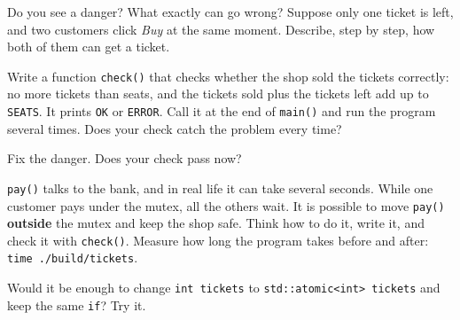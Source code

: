 \begin{questions}
  \item Do you see a danger? What exactly can go wrong? Suppose only one ticket is left, and two customers
        click \emph{Buy} at the same moment. Describe, step by step, how both of them can get a ticket.
  \item Write a function \texttt{check()} that checks whether the shop sold the tickets correctly: no more tickets
        than seats, and the tickets sold plus the tickets left add up to \texttt{SEATS}. It prints \texttt{OK} or
        \texttt{ERROR}. Call it at the end of \texttt{main()} and run the program several times.
        Does your check catch the problem every time?
  \item Fix the danger. Does your check pass now?
  \item \texttt{pay()} talks to the bank, and in real life it can take several seconds. While one customer pays
        under the mutex, all the others wait. It is possible to move \texttt{pay()} \textbf{outside} the mutex and keep
        the shop safe. Think how to do it, write it, and check it with \texttt{check()}.
        Measure how long the program takes before and after: \texttt{time ./build/tickets}.
  \item Would it be enough to change \texttt{int tickets} to \texttt{std::atomic<int> tickets} and keep the
        same \texttt{if}? Try it.
\end{questions}
